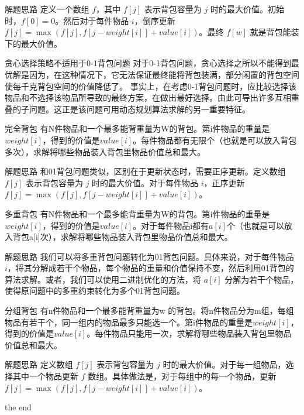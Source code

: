 \documentclass{beamer}
\begin{document}
\begin{frame}{解题思路}
    定义一个数组 $f$，其中 $f[j]$ 表示背包容量为 $j$ 时的最大价值。初始时，$f[0] = 0$。然后对于每件物品 $i$，倒序更新 $f[j] = \max(f[j], f[j - weight[i]] + value[i])$。最终 $f[w]$ 就是背包能装下的最大价值。
\end{frame}

\begin{frame}{贪心选择策略不适用于0-1背包问题}
    对于0-1背包问题，贪心选择之所以不能得到最优解是因为，在这种情况下，它无法保证最终能将背包装满，部分闲置的背包空间使每千克背包空间的价值降低了。 事实上，在考虑0-1背包问题时，应比较选择该物品和不选择该物品所导致的最终方案，在做出最好选择。由此可导出许多互相重叠的子问题。这正是该问题可用动态规划算法求解的另一重要特征。
\end{frame}

\begin{frame}{完全背包}
    有N件物品和一个最多能背重量为W的背包。第i件物品的重量是$weight[i]$，得到的价值是$value[i]$。每件物品都有无限个（也就是可以放入背包多次），求解将哪些物品装入背包里物品价值总和最大。
\end{frame}

\begin{frame}{解题思路}
    和01背包问题类似，区别在于更新状态时，需要正序更新。定义数组 $f[j]$ 表示背包容量为 $j$ 时的最大价值。对于每件物品 $i$，正序更新 $f[j] = \max(f[j], f[j - weight[i]] + value[i])$。
\end{frame}

\begin{frame}{多重背包}
    有N件物品和一个最多能背重量为W的背包。第i件物品的重量是$weight[i]$，得到的价值是$value[i]$。对于每件物品i都有$a[i]$个（也就是可以放入背包a[i]次），求解将哪些物品装入背包里物品价值总和最大。
\end{frame}

\begin{frame}{解题思路}
    我们可以将多重背包问题转化为01背包问题。具体来说，对于每件物品 $i$，将其分解成若干个物品，每个物品的重量和价值保持不变，然后利用01背包的算法求解。或者，我们可以使用二进制优化的方法，将 $a[i]$ 分解为若干个物品，使得原问题中的多重约束转化为多个01背包问题。
\end{frame}

\begin{frame}{分组背包}
    有n件物品和一个最多能背重量为w 的背包。将n件物品分为m组，每组物品有若干个，同一组内的物品最多只能选一个。第i件物品的重量是$weight[i]$，得到的价值是$value[i]$。每件物品只能用一次，求解将哪些物品装入背包里物品价值总和最大。
\end{frame}

\begin{frame}{解题思路}
    定义数组 $f[j]$ 表示背包容量为 $j$ 时的最大价值。对于每一组物品，选择其中一个物品更新 $f$ 数组。具体做法是，对于每组中的每一个物品，更新 $f[j] = \max(f[j], f[j - weight[i]] + value[i])$。
\end{frame}

\begin{frame}{}
    \centering
    \Huge the end
\end{frame}
\end{document}
